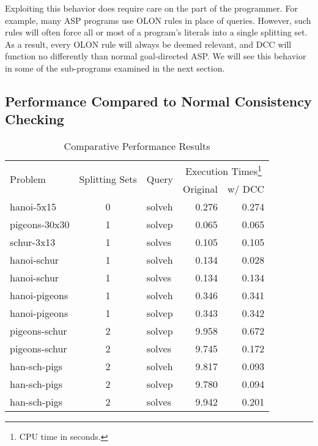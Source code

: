 \documentclass{new_tlp}
\begin{document}
Exploiting this behavior does require care on the part of the programmer. For 
example, many ASP programs use OLON rules in place of queries. However, such 
rules will often force all or most of a program's literals into a single 
splitting set. As a result, every OLON rule will always be deemed relevant, and 
DCC will function no differently than normal goal-directed ASP. We will see
this behavior in some of the sub-programs examined in the next section.

\subsection{Performance Compared to Normal Consistency Checking} 
\label{sec:performance}

\begin{table}
	\caption{Comparative Performance Results}
	\label{tab:perf}
	\begin{minipage}{\textwidth}
	\begin{tabular}{lclrr}
		\hline\hline
		\multicolumn{1}{l}{\multirow{2}{*}{Problem}} &
		\multicolumn{1}{c}{\multirow{2}{*}{Splitting Sets}} &
		\multicolumn{1}{l}{\multirow{2}{*}{Query}} &
		\multicolumn{2}{c}{\multirow{1}{*}{Execution Times\footnote{CPU time in seconds.}}} \\
		& & & Original & w/ DCC \\
		\noalign{\smallskip}
		\hline
		\noalign{\smallskip}
		hanoi-5x15    & 0 & solveh & 0.276 & 0.274\\
		pigeons-30x30 & 1 & solvep & 0.065 & 0.065\\
		schur-3x13    & 1 & solves & 0.105 & 0.105\\
		hanoi-schur   & 1 & solveh & 0.134 & 0.028\\
		hanoi-schur   & 1 & solves & 0.134 & 0.134\\
		hanoi-pigeons & 1 & solveh & 0.346 & 0.341\\
		hanoi-pigeons & 1 & solvep & 0.343 & 0.342\\
		pigeons-schur & 2 & solvep & 9.958 & 0.672\\
		pigeons-schur & 2 & solves & 9.745 & 0.172\\
		han-sch-pigs  & 2 & solveh & 9.817 & 0.093\\
		han-sch-pigs  & 2 & solvep & 9.780 & 0.094\\
		han-sch-pigs  & 2 & solves & 9.942 & 0.201\\
		\hline\hline
	\end{tabular}
	\vspace{-0.5\baselineskip}
	\end{minipage}
\end{table}
\end{document}
